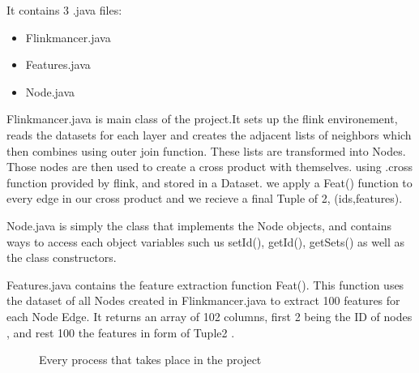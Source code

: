 It contains 3 .java files:
\begin{itemize} 
\item Flinkmancer.java
\item Features.java
\item Node.java
\end{itemize}

Flinkmancer.java is main class of the project.It sets up the flink environement, reads the datasets for each layer and creates the adjacent lists of neighbors which then combines using outer join function. These lists are transformed into Nodes. Those nodes are then used to create a cross product with themselves. using .cross function provided by flink, and stored in a Dataset. we apply a Feat() function to every edge in our cross product and we recieve a final Tuple of 2, (ids,features). \newline

Node.java is simply the class that implements the Node objects, and contains ways to access each object variables such us setId(), getId(), getSets() as well as the class constructors. \newline

Features.java contains the feature extraction function Feat(). This function uses the dataset of all Nodes created in Flinkmancer.java to extract 100 features for each Node Edge. It returns an array of 102 columns, first 2 being the ID of nodes , and rest 100 the features in form of Tuple2 .
\begin{figure}[ht]
\noindent{}
\caption{Every process that takes place in the project}
\label{fig:graph}
\end{figure}
